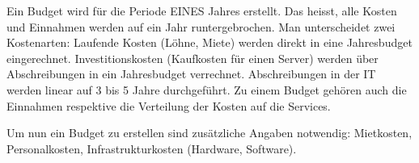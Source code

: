 Ein Budget wird für die Periode EINES Jahres erstellt. Das heisst, alle Kosten und Einnahmen werden auf ein Jahr runtergebrochen. Man unterscheidet zwei Kostenarten: Laufende Kosten (Löhne, Miete) werden direkt in eine Jahresbudget eingerechnet. Investitionskosten (Kaufkosten für einen Server) werden über Abschreibungen in ein Jahresbudget verrechnet. Abschreibungen in der IT werden linear auf 3 bis 5 Jahre durchgeführt. Zu einem Budget gehören auch die Einnahmen respektive die Verteilung der Kosten auf die Services.

Um nun ein Budget zu erstellen sind zusätzliche Angaben notwendig: Mietkosten, Personalkosten, Infrastrukturkosten (Hardware, Software).